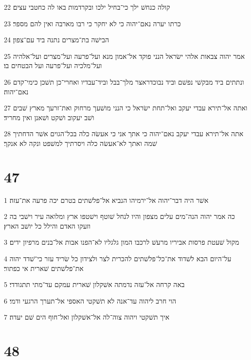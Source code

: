 \par 22 קולה כנחשׁ ילך כי־בחיל ילכו ובקרדמות באו לה כחטבי עצים׃
\par 23 כרתו יערה נאם־יהוה כי לא יחקר כי רבו מארבה ואין להם מספר׃
\par 24 הבישׁה בת־מצרים נתנה ביד עם־צפון׃
\par 25 אמר יהוה צבאות אלהי ישׂראל הנני פוקד אל־אמון מנא ועל־פרעה ועל־מצרים ועל־אלהיה ועל־מלכיה ועל־פרעה ועל הבטחים בו׃
\par 26 ונתתים ביד מבקשׁי נפשׁם וביד נבוכדראצר מלך־בבל וביד־עבדיו ואחרי־כן תשׁכן כימי־קדם נאם־יהוה׃
\par 27 ואתה אל־תירא עבדי יעקב ואל־תחת ישׂראל כי הנני מושׁעך מרחוק ואת־זרעך מארץ שׁבים ושׁב יעקוב ושׁקט ושׁאנן ואין מחריד׃
\par 28 אתה אל־תירא עבדי יעקב נאם־יהוה כי אתך אני כי אעשׂה כלה בכל־הגוים אשׁר הדחתיך שׁמה ואתך לא־אעשׂה כלה ויסרתיך למשׁפט ונקה לא אנקך׃

\chapter{47}

\par 1 אשׁר היה דבר־יהוה אל־ירמיהו הנביא אל־פלשׁתים בטרם יכה פרעה את־עזה׃
\par 2 כה אמר יהוה הנה־מים עלים מצפון והיו לנחל שׁוטף וישׁטפו ארץ ומלואה עיר וישׁבי בה וזעקו האדם והילל כל יושׁב הארץ׃
\par 3 מקול שׁעטת פרסות אביריו מרעשׁ לרכבו המון גלגליו לא־הפנו אבות אל־בנים מרפיון ידים׃
\par 4 על־היום הבא לשׁדוד את־כל־פלשׁתים להכרית לצר ולצידון כל שׂריד עזר כי־שׁדד יהוה את־פלשׁתים שׁארית אי כפתור׃
\par 5 באה קרחה אל־עזה נדמתה אשׁקלון שׁארית עמקם עד־מתי תתגודדי׃
\par 6 הוי חרב ליהוה עד־אנה לא תשׁקטי האספי אל־תערך הרגעי ודמי׃
\par 7 איך תשׁקטי ויהוה צוה־לה אל־אשׁקלון ואל־חוף הים שׁם יעדה׃

\chapter{48}

